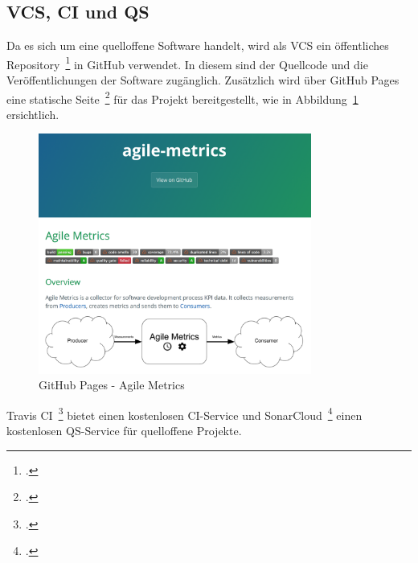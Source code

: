 \subsection{\ac{VCS}, \ac{CI} und \ac{QS}}

Da es sich um eine quelloffene Software handelt, wird als \ac{VCS} ein öffentliches Repository~\footcite{agile_metrics_repo} in GitHub verwendet.
In diesem sind der Quellcode und die Veröffentlichungen der Software zugänglich.
Zusätzlich wird über GitHub Pages eine statische Seite~\footcite{agile_metrics_page} für das Projekt bereitgestellt, wie in Abbildung~\ref{fig:github_pages} ersichtlich.

\begin{savenotes}
    \begin{figure}[H] 
        \centering
            \includegraphics[width=0.8\textwidth]{img/github-pages.png}
        \caption{GitHub Pages {-} Agile Metrics}\label{fig:github_pages}
    \end{figure}
\end{savenotes}

Travis CI~\footcite{travis_agile_metrics} bietet einen kostenlosen \ac{CI}-Service und SonarCloud~\footcite{sonarcloud_agile_metrics} einen kostenlosen \ac{QS}-Service für quelloffene Projekte.

